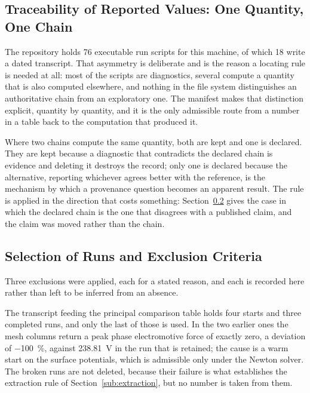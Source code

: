 \documentclass[10pt,a4paper,twocolumn]{article}
\theoremstyle{plain}
\theoremstyle{remark}
\begin{document}
\subsection{Traceability of Reported Values: One Quantity, One Chain}
\label{sub:chain}

The repository holds \num{76} executable run scripts for this machine,
of which \num{18} write a dated transcript. That asymmetry is deliberate
and is the reason a locating rule is needed at all: most of the scripts
are diagnostics, several compute a quantity that is also computed
elsewhere, and nothing in the file system distinguishes an authoritative
chain from an exploratory one. The manifest makes that distinction
explicit, quantity by quantity, and it is the only admissible route from
a number in a table back to the computation that produced it.

Where two chains compute the same quantity, both are kept and one is
declared. They are kept because a diagnostic that contradicts the
declared chain is evidence and deleting it destroys the record; only one
is declared because the alternative, reporting whichever agrees better
with the reference, is the mechanism by which a provenance question
becomes an apparent result. The rule is applied in the direction that
costs something: Section~\ref{sub:selection} gives the case in which the
declared chain is the one that disagrees with a published claim, and the
claim was moved rather than the chain.

\subsection{Selection of Runs and Exclusion Criteria}
\label{sub:selection}

Three exclusions were applied, each for a stated reason, and each is
recorded here rather than left to be inferred from an absence.

The transcript feeding the principal comparison table holds four starts
and three completed runs, and only the last of those is used. In the two
earlier ones the mesh columns return a peak phase electromotive force of
exactly zero, a deviation of \SI{-100}{\percent}, against
\SI{238.81}{\volt} in the run that is retained; the cause is a warm
start on the surface potentials, which is admissible only under the
Newton solver. The broken runs are not deleted, because their failure is
what establishes the extraction rule of
Section~\ref{sub:extraction}, but no number is taken from them.
\end{document}
